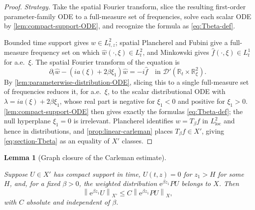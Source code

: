 \documentclass[11pt,oneside]{book}
\providecommand{\uses}[1]{}
\newtheorem{lemma}[theorem]{Lemma}
\theoremstyle{definition}
\theoremstyle{remark}
\newcommand{\R}{\mathbb R}
\newcommand{\D}{\mathcal D}
\newcommand{\1}{\mathbf 1}
\newcommand{\loc}{\mathrm{loc}}
\newcommand{\norm}[1]{\left\lVert #1\right\rVert}
\newcommand{\e}{\mathrm e}
\begin{document}
\begin{proof}
\uses{lem:parameterwise-distribution-ODE, lem:compact-support-ODE, def:Tbeta, prop:linear-carleman}
\emph{Strategy.} Take the spatial Fourier transform, slice the resulting first-order
parameter-family ODE to a full-measure set of frequencies, solve each scalar ODE by
\cref{lem:compact-support-ODE}, and recognize the formula as \eqref{eq:Tbeta-def}.

Bounded time support gives $w\in L^2_{t,z}$; spatial Plancherel and Fubini give a
full-measure frequency set on which $\widehat w(\cdot,\xi)\in L^2_t$, and Minkowski gives
$\widehat f(\cdot,\xi)\in L^1_t$ for a.e.\ $\xi$. The spatial Fourier transform of the
equation is
\[
 \partial_t\widehat w-(ia(\xi)+2\beta\xi_1)\widehat w=-i\widehat f
 \quad\text{in }\D'(\R_t\times\R^2_\xi).
\]
By \cref{lem:parameterwise-distribution-ODE}, slicing this to a single full-measure set of frequencies reduces it, for a.e.\ $\xi$, to the
scalar distributional ODE with $\lambda=ia(\xi)+2\beta\xi_1$, whose real part is negative for
$\xi_1<0$ and positive for $\xi_1>0$. \cref{lem:compact-support-ODE} then gives exactly the
formulas \eqref{eq:Tbeta-def}; the null hyperplane $\xi_1=0$ is irrelevant. Plancherel
identifies $w=T_\beta f$ in $L^2_{\loc}$ and hence in distributions, and
\cref{prop:linear-carleman} places $T_\beta f\in X'$, giving \eqref{eq:section-Tbeta} as an
equality of $X'$ classes.
\end{proof}

\begin{lemma}[Graph closure of the Carleman estimate]\label{lem:carleman-closure}
\uses{def:conjugated-operator, def:carleman-spaces}
Suppose $U\in X'$ has compact support in time, $U(t,z)=0$ for $z_1>H$ for some $H$, and, for
a fixed $\beta>0$, the weighted distribution $\e^{\beta z_1}PU$ belongs to $X$. Then
\begin{equation}
 \norm{\e^{\beta z_1}U}_{X'}\le C\norm{\e^{\beta z_1}PU}_{X}, \label{eq:graph-carleman}
\end{equation}
with $C$ absolute and independent of $\beta$.
\end{lemma}
\end{document}
